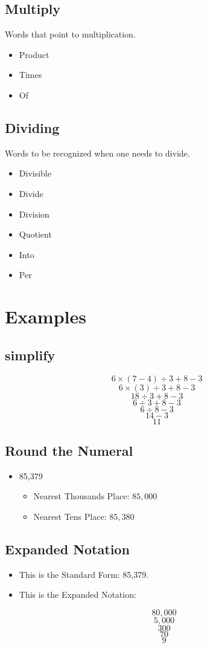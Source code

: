 \documentclass[]{article}
\begin{document}
\subsection{Multiply}
Words that point to multiplication. 
\begin{itemize}
	\item Product
	\item Times 
	\item Of	
\end{itemize}
\subsection{Dividing}
Words to be recognized when one needs to divide. 
\begin{itemize}
	\item Divisible
	\item Divide
	\item Division
	\item Quotient
	\item Into
	\item Per
\end{itemize}

\section{Examples}
\subsection{simplify}
$$6 \times (7 - 4) \div 3 + 8 - 3 $$
$$6 \times (3) \div 3 + 8 - 3 $$
$$18  \div 3 + 8 - 3 $$
$$6 \div 3 + 8 - 3 $$
$$6 \div 8 - 3 $$
$$14 - 3$$
$$ 11$$

\subsection{Round the Numeral}
\begin{itemize}
	\item 85,379
\begin{itemize}
	\item Nearest Thousands Place:
	$85,000$
	\item Nearest Tens Place:
	$85,380$
	
\end{itemize}
\end{itemize}

\subsection{Expanded Notation}
\begin{itemize}
	\item This is the Standard Form: 85,379.
	\item This is the Expanded Notation: 
	
	$$80,000$$
	$$5,000$$
	$$300$$
	$$70$$
	$$9$$
\end{itemize}
\end{document}
